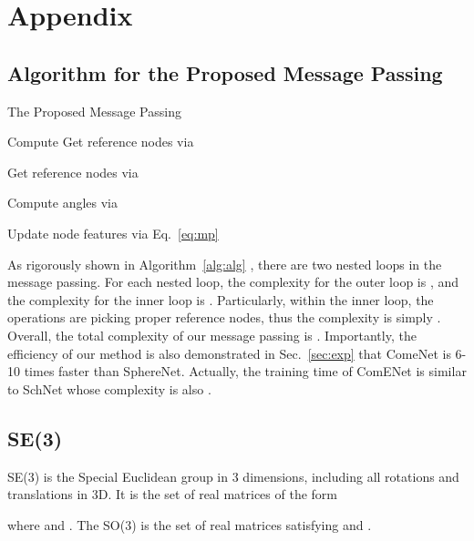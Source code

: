 \documentclass{article}
\begin{document}

 

\newpage
\appendix


\section{Appendix}

\subsection{Algorithm for the Proposed Message Passing} \label{sec:alg}

\begin{algorithm}[H]
\caption{The Proposed Message Passing}\label{alg:alg}
\begin{algorithmic}[1]
\FOR{}
\FOR{}
\STATE Compute 
\ENDFOR
\STATE Get reference nodes via
\vspace{-6pt}

\vspace{-16pt}
\ENDFOR
\FOR{}
\FOR{}
\STATE Get reference nodes via
\vspace{-6pt}

\vspace{-10pt}
\STATE Compute angles via
\vspace{-6pt}

\vspace{-15pt}
\ENDFOR
\STATE Update node features via Eq.~\ref{eq:mp}
\ENDFOR
\end{algorithmic}
\end{algorithm}

As rigorously shown in Algorithm~\ref{alg:alg} , there are two nested loops in the message passing.
For each nested loop, the complexity for the outer loop is , and the complexity for the inner loop is .
Particularly, within the inner loop,
the operations are picking proper reference nodes, thus the complexity is simply . 
Overall, the total complexity of our message passing is .
Importantly, the efficiency of our method is also demonstrated in Sec.~\ref{sec:exp} that ComeNet is 6-10 times faster than SphereNet.
Actually, the training time of ComENet is similar to SchNet whose complexity is also .

\subsection{SE(3)} \label{SE(3)}
\textcolor{COLOR}{
SE(3) is the Special Euclidean group in 3 dimensions, including all rotations and translations in 3D. It is the set of  real matrices of the form 

where  and . 
The SO(3) is the set of  real matrices  satisfying 
 and .
}
\end{document}
